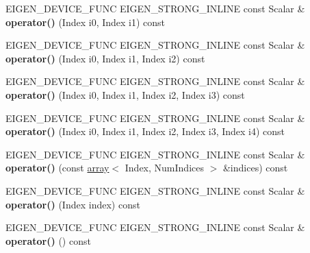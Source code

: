 \begin{DoxyCompactItemize}
E\+I\+G\+E\+N\+\_\+\+D\+E\+V\+I\+C\+E\+\_\+\+F\+U\+NC E\+I\+G\+E\+N\+\_\+\+S\+T\+R\+O\+N\+G\+\_\+\+I\+N\+L\+I\+NE const Scalar \& {\bfseries operator()} (Index i0, Index i1) const
\item 
\mbox{\label{class_eigen_1_1_tensor_a46be5bbd964515a4eadd5823eb411710}} 
E\+I\+G\+E\+N\+\_\+\+D\+E\+V\+I\+C\+E\+\_\+\+F\+U\+NC E\+I\+G\+E\+N\+\_\+\+S\+T\+R\+O\+N\+G\+\_\+\+I\+N\+L\+I\+NE const Scalar \& {\bfseries operator()} (Index i0, Index i1, Index i2) const
\item 
\mbox{\label{class_eigen_1_1_tensor_a4f4188e0a57cfa3cc3045a63cac0d4e6}} 
E\+I\+G\+E\+N\+\_\+\+D\+E\+V\+I\+C\+E\+\_\+\+F\+U\+NC E\+I\+G\+E\+N\+\_\+\+S\+T\+R\+O\+N\+G\+\_\+\+I\+N\+L\+I\+NE const Scalar \& {\bfseries operator()} (Index i0, Index i1, Index i2, Index i3) const
\item 
\mbox{\label{class_eigen_1_1_tensor_ac245b695cfa23d0bd55da9a45fa631ae}} 
E\+I\+G\+E\+N\+\_\+\+D\+E\+V\+I\+C\+E\+\_\+\+F\+U\+NC E\+I\+G\+E\+N\+\_\+\+S\+T\+R\+O\+N\+G\+\_\+\+I\+N\+L\+I\+NE const Scalar \& {\bfseries operator()} (Index i0, Index i1, Index i2, Index i3, Index i4) const
\item 
\mbox{\label{class_eigen_1_1_tensor_a8536695d70e710a6825280b1cfe6cf85}} 
E\+I\+G\+E\+N\+\_\+\+D\+E\+V\+I\+C\+E\+\_\+\+F\+U\+NC E\+I\+G\+E\+N\+\_\+\+S\+T\+R\+O\+N\+G\+\_\+\+I\+N\+L\+I\+NE const Scalar \& {\bfseries operator()} (const \hyperlink{class_eigen_1_1array}{array}$<$ Index, Num\+Indices $>$ \&indices) const
\item 
\mbox{\label{class_eigen_1_1_tensor_af7543d3acfec8f5775398d58316e6b0d}} 
E\+I\+G\+E\+N\+\_\+\+D\+E\+V\+I\+C\+E\+\_\+\+F\+U\+NC E\+I\+G\+E\+N\+\_\+\+S\+T\+R\+O\+N\+G\+\_\+\+I\+N\+L\+I\+NE const Scalar \& {\bfseries operator()} (Index index) const
\item 
\mbox{\label{class_eigen_1_1_tensor_afc84f95c348b742c73adc8160b1c2c3a}} 
E\+I\+G\+E\+N\+\_\+\+D\+E\+V\+I\+C\+E\+\_\+\+F\+U\+NC E\+I\+G\+E\+N\+\_\+\+S\+T\+R\+O\+N\+G\+\_\+\+I\+N\+L\+I\+NE const Scalar \& {\bfseries operator()} () const
\item 
\mbox{\label{class_eigen_1_1_tensor_a114c73b222119386bd5df7c7702186d6}} 

\end{DoxyCompactItemize}
